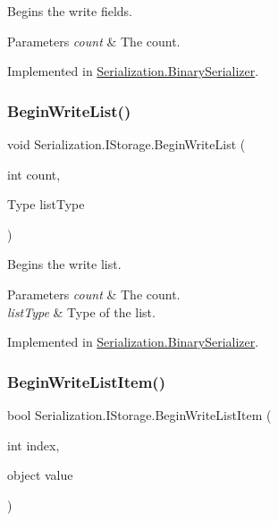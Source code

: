 Begins the write fields. 


\begin{DoxyParams}{Parameters}
{\em count} & The count.\\
\hline
\end{DoxyParams}


Implemented in \hyperlink{class_serialization_1_1_binary_serializer_a40709bdcdae381b2138a48e005e96ab2}{Serialization.\+Binary\+Serializer}.

\mbox{\label{interface_serialization_1_1_i_storage_afaa8cb1cee211688a43655b1f503ca12}} 
\subsubsection{\texorpdfstring{Begin\+Write\+List()}{BeginWriteList()}}
{\footnotesize\ttfamily void Serialization.\+I\+Storage.\+Begin\+Write\+List (\begin{DoxyParamCaption}\item[{int}]{count,  }\item[{Type}]{list\+Type }\end{DoxyParamCaption})}



Begins the write list. 


\begin{DoxyParams}{Parameters}
{\em count} & The count.\\
\hline
{\em list\+Type} & Type of the list.\\
\hline
\end{DoxyParams}


Implemented in \hyperlink{class_serialization_1_1_binary_serializer_a70c5b0751ea84a7db8cb2b4a89576db3}{Serialization.\+Binary\+Serializer}.

\mbox{\label{interface_serialization_1_1_i_storage_a1f2891613afdde349dd1bede1187af08}} 
\subsubsection{\texorpdfstring{Begin\+Write\+List\+Item()}{BeginWriteListItem()}}
{\footnotesize\ttfamily bool Serialization.\+I\+Storage.\+Begin\+Write\+List\+Item (\begin{DoxyParamCaption}\item[{int}]{index,  }\item[{object}]{value }\end{DoxyParamCaption})}



